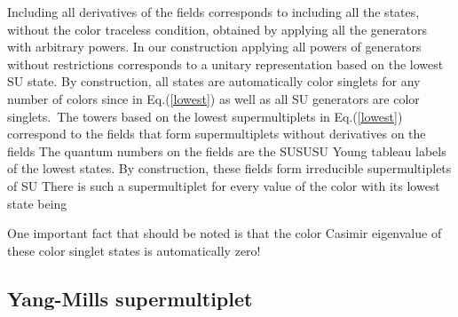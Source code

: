 \documentclass[a4paper,aps,preprint,nofootinbib]{revtex4}
\begin{document}
Including all derivatives of the fields corresponds to including all the
states, without the color traceless condition, obtained by applying all the
generators with arbitrary powers. In our construction applying all powers of
generators without restrictions corresponds to a unitary representation
based on the lowest SU\coordHE{} state. By construction, all
states are automatically color singlets for any number of colors \coordHE{} since
in Eq.(\ref{lowest}) \coordHE{} as well as all SU\coordHE{} generators are color singlets.\ The towers based on the lowest
supermultiplets in Eq.(\ref{lowest}) correspond to the fields that form
supermultiplets without derivatives on the fields\coordHE{} The quantum numbers on
the fields are the SU\myHighlight{$\left( 2\right) \times$}\coordHE{}SU\myHighlight{$\left( 2\right) \times $}\coordHE{}SU\myHighlight{$
\left( 4\right) $}\coordHE{} Young tableau labels of the lowest states. By
construction, these fields form irreducible supermultiplets of SU\coordHE{} There is such a supermultiplet for every value of the color \coordHE{} with its lowest state being \coordHE{}

One important fact that should be noted is that the color Casimir eigenvalue
\coordHE{} of these color singlet states is automatically
zero!

\subsection{Yang-Mills supermultiplet}
\end{document}
